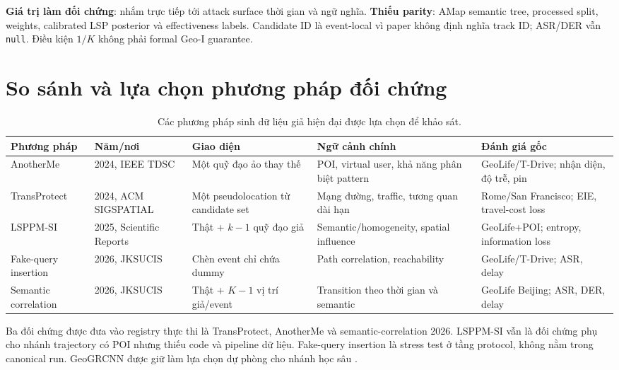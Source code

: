 \documentclass[12pt,a4paper,oneside]{report}
\begin{document}
\textbf{Giá trị làm đối chứng}: nhắm trực tiếp tới attack surface thời gian và ngữ nghĩa. \textbf{Thiếu parity}: AMap semantic tree, processed split, weights, calibrated LSP posterior và effectiveness labels. Candidate ID là event-local vì paper không định nghĩa track ID; ASR/DER vẫn \texttt{null}. Điều kiện $1/K$ không phải formal Geo-I guarantee.

\section{So sánh và lựa chọn phương pháp đối chứng}

\begin{table}[htbp]
\centering
\footnotesize
\caption{Các phương pháp sinh dữ liệu giả hiện đại được lựa chọn để khảo sát.}
\label{tab:sota}
\begin{tabularx}{\textwidth}{P{2.35cm}P{2.05cm}P{3.0cm}Y P{3.0cm}}
\toprule
\textbf{Phương pháp} & \textbf{Năm/nơi} & \textbf{Giao diện} & \textbf{Ngữ cảnh chính} & \textbf{Đánh giá gốc} \\
\midrule
AnotherMe & 2024, IEEE TDSC & Một quỹ đạo ảo thay thế & POI, virtual user, khả năng phân biệt pattern & GeoLife/T-Drive; nhận diện, độ trễ, pin \\
\addlinespace
TransProtect & 2024, ACM SIGSPATIAL & Một pseudolocation từ candidate set & Mạng đường, traffic, tương quan dài hạn & Rome/San Francisco; EIE, travel-cost loss \\
\addlinespace
LSPPM-SI & 2025, Scientific Reports & Thật + $k-1$ quỹ đạo giả & Semantic/homogeneity, spatial influence & GeoLife+POI; entropy, information loss \\
\addlinespace
Fake-query insertion & 2026, JKSUCIS & Chèn event chỉ chứa dummy & Path correlation, reachability & GeoLife/T-Drive; ASR, delay \\
\addlinespace
Semantic correlation & 2026, JKSUCIS & Thật + $K-1$ vị trí giả/event & Transition theo thời gian và semantic & GeoLife Beijing; ASR, DER, delay \\
\bottomrule
\end{tabularx}
\end{table}

Ba đối chứng được đưa vào registry thực thi là TransProtect, AnotherMe và semantic-correlation 2026. LSPPM-SI vẫn là đối chứng phụ cho nhánh trajectory có POI nhưng thiếu code và pipeline dữ liệu. Fake-query insertion là stress test ở tầng protocol, không nằm trong canonical run. GeoGRCNN được giữ làm lựa chọn dự phòng cho nhánh học sâu \citep{narayanan2024geogrcnn}.
\end{document}
